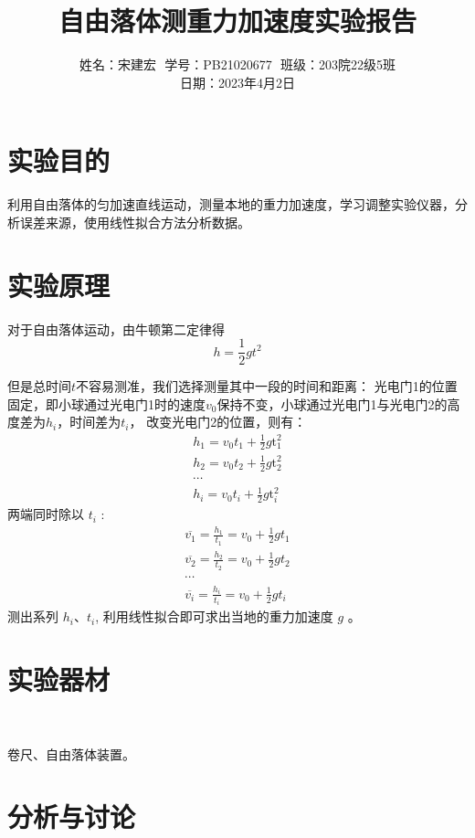 \documentclass[12pt]{article}
\title{自由落体测重力加速度实验报告}
\author{姓名：宋建宏\,\, 学号：PB21020677\,\, 班级：203院22级5班\\ 日期：2023年4月2日}
\date{}
\begin{document}
\maketitle
\section*{实验目的}
利用自由落体的匀加速直线运动，测量本地的重力加速度，学习调整实验仪器，分析误差来源，使用线性拟合方法分析数据。

\section*{实验原理}
对于自由落体运动，由牛顿第二定律得
\begin{equation}\label{1}
    h=\frac{1}{2}gt^2
\end{equation}

但是总时间\(t\)不容易测准，我们选择测量其中一段的时间和距离：
光电门1的位置固定，即小球通过光电门1时的速度$v_0$保持不变，小球通过光电门1与光电门2的高度差为$h_i$，时间差为$t_i$，
改变光电门2的位置，则有：
$$
    \begin{gathered}
        h_1=v_0 t_1+\frac{1}{2} g \mathrm{t}_1^2 \\
        h_2=v_0 t_2+\frac{1}{2} g \mathrm{t}_2^2 \\
        \cdots \\
        h_i=v_0 t_i+\frac{1}{2} g \mathrm{t}_i^2
    \end{gathered}
$$
两端同时除以 $t_i$ :
$$
    \begin{gathered}
        \overline{v_1}=\frac{h_1}{t_1}=v_0+\frac{1}{2} g t_1 \\
        \overline{v_2}=\frac{h_2}{t_2}=v_0+\frac{1}{2} g t_2 \\
        \cdots \\
        \overline{v_i}=\frac{h_i}{t_i}=v_0+\frac{1}{2} g t_i
    \end{gathered}
$$
测出系列 $h_i 、 t_i$, 利用线性拟合即可求出当地的重力加速度 $g$ 。

\section*{实验器材}
\

卷尺、自由落体装置。

\section*{分析与讨论}
\end{document}
